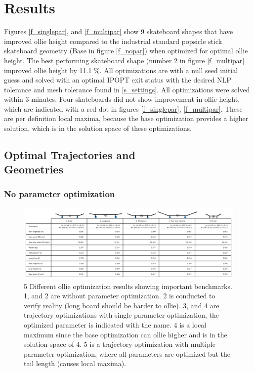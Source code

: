 \documentclass[default,iicol]{sn-jnl}
\begin{document}
\section{Results}
Figures \ref{f_singlepar}, and \ref{f_multipar} show 9 skateboard shapes that have improved ollie height compared to the industrial standard popsicle stick skateboard geometry (Base in figure \ref{f_nopar}) when optimized for optimal ollie height. The best performing skateboard shape (number 2 in figure \ref{f_multipar} improved ollie height by 11.1 \%. All optimizations are with a null seed initial guess and solved with an optimal IPOPT exit status with the desired NLP tolerance and mesh tolerance found in \ref{s_settings}. All optimizations were solved within 3 minutes. Four skateboards did not show improvement in ollie height, which are indicated with a red dot in figures \ref{f_singlepar}, \ref{f_multipar}. These are per definition local maxima, because the base optimization provides a higher solution, which is in the solution space of these optimizations. 

\subsection{Optimal Trajectories and \\Geometries}
\subsubsection{No parameter optimization}
\begin{figure}
    \centering
    \includegraphics[width=\textwidth]{paper/figure/Results/ResultsTable.png}
    \caption[Results benchmarks]{5 Different ollie optimization results showing important benchmarks. 1, and 2 are without parameter optimization. 2 is conducted to verify reality (long board should be harder to ollie). 3, and 4 are trajectory optimizations with single parameter optimization, the optimized parameter is indicated with the name. 4 is a local maximum since the base optimization can ollie higher and is in the solution space of 4. 5 is a trajectory optimization with multiple parameter optimization, where all parameters are optimized but the tail length (causes local maxima).}
    \label{fig:enter-label}
\end{figure}
\end{document}
